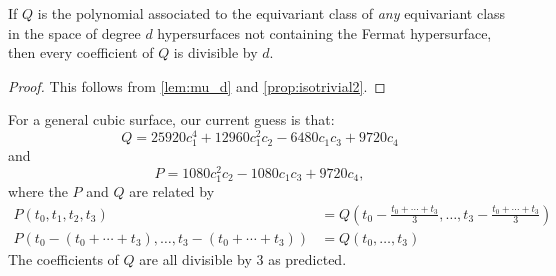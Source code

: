\documentclass[12pt,reqno]{amsart}
\numberwithin{equation}{section}
\begin{document}
\begin{proposition}
\label{prop:divd}
If $Q$ is the polynomial associated to the equivariant class of \emph{any} equivariant class in the space of degree $d$ hypersurfaces not containing the Fermat hypersurface, then every coefficient of $Q$ is divisible by $d$.
\end{proposition}

\begin{proof}
This follows from \autoref{lem:mu_d} and \autoref{prop:isotrivial2}.
\end{proof}

\begin{example}
For a general cubic surface, our current guess is that:
$$Q = 25920 c_1^4+12960 c_1^2 c_2-6480 c_1 c_3+9720 c_4$$
 and
$$P = 1080 c_1^2 c_2-1080 c_1 c_3+9720 c_4,$$
where the $P$ and $Q$ are related by
\begin{align*}
P(t_0,t_1,t_2,t_3) &= Q(t_0 - \frac{t_0+\cdots+t_3}{3},\ldots, t_3 - \frac{t_0+\cdots+t_3}{3})\\
P(t_0 - (t_0+\cdots+t_3), \ldots, t_3 - (t_0+\cdots+t_3)) &= Q(t_0,\ldots,t_3)
\end{align*}
The coefficients of $Q$  are all divisible by 3 as predicted.
\end{example}


\end{document}

